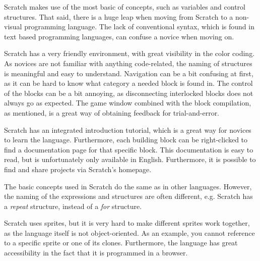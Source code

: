 \begin{description}[style=nextline]
\item[Pedagogic Value] Scratch makes use of the most basic of concepts, such as variables and control structures. That said, there is a huge leap when moving from Scratch to a non-visual programming language. The lack of conventional syntax, which is found in text based programming languages, can confuse a novice when moving on.
\item[Environment] Scratch has a very friendly environment, with great visibility in the color coding. As novices are not familiar with anything code-related, the naming of structures is meaningful and easy to understand. Navigation can be a bit confusing at first, as it can be hard to know what category a needed block is found in. The control of the blocks can be a bit annoying, as disconnecting interlocked blocks does not always go as expected. The game window combined with the block compilation, as mentioned, is a great way of obtaining feedback for trial-and-error.
\item[Documentation] Scratch has an integrated introduction tutorial, which is a great way for novices to learn the language. Furthermore, each building block can be right-clicked to find a documentation page for that specific block. This documentation is easy to read, but is unfortunately only available in English. Furthermore, it is possible to find and share projects via Scratch's homepage.
\item[Uniformity] The basic concepts used in Scratch do the same as in other languages. However, the naming of the expressions and structures are often different, e.g. Scratch has a \emph{repeat} structure, instead of a \emph{for} structure.
\item[Miscellaneous] Scratch uses sprites, but it is very hard to make different sprites work together, as the language itself is not object-oriented. As an example, you cannot reference to a specific sprite or one of its clones. Furthermore, the language has great accessibility in the fact that it is programmed in a browser.
\end{description}